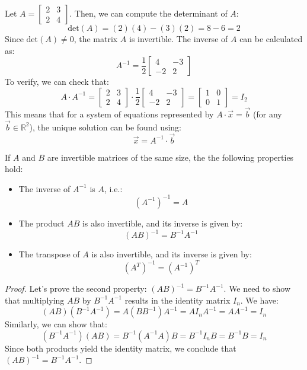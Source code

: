 \begin{eg}
    Let $A = \begin{bmatrix}
        2 & 3 \\
        2 & 4
    \end{bmatrix}$. Then, we can compute the determinant of \( A \):
    \[
        \text{det}(A) = (2)(4) - (3)(2) = 8 - 6 = 2
    \]
    Since \( \text{det}(A) \neq 0 \), the matrix \( A \) is invertible. The inverse of \( A \) can be calculated as:
    \[
        A^{-1} = \frac{1}{2} \begin{bmatrix}
            4 & -3 \\
            -2 & 2
        \end{bmatrix}
    \]
    To verify, we can check that:
    \[
        A \cdot A^{-1} = \begin{bmatrix}
            2 & 3 \\
            2 & 4
        \end{bmatrix} \cdot \frac{1}{2} \begin{bmatrix}
            4 & -3 \\
            -2 & 2
        \end{bmatrix} = \begin{bmatrix}
            1 & 0 \\
            0 & 1
        \end{bmatrix} = I_2
    \]
    This means that for a system of equations represented by \( A \cdot \vec{x} = \vec{b} \) (for any $\vec{b} \in \mathbb{R}^2$), the unique solution can be found using:
    \[
        \vec{x} = A^{-1} \cdot \vec{b}
    \]
\end{eg}
\begin{theorem}
    If $A$ and $B$ are invertible matrices of the same size, the the following properties hold:
    \begin{itemize}[itemsep=1pt,label=$\circ$]
        \item The inverse of $A^{-1}$ is $A$, i.e.:
        \[
            (A^{-1})^{-1} = A
        \]
        \item The product $AB$ is also invertible, and its inverse is given by:
        \[
            (AB)^{-1} = B^{-1} A^{-1}
        \]
        \item The transpose of $A$ is also invertible, and its inverse is given by:
        \[
            (A^T)^{-1} = (A^{-1})^T
        \]
    \end{itemize}
\end{theorem}
\begin{proof}
    Let's prove the second property: \( (AB)^{-1} = B^{-1} A^{-1} \). We need to show that multiplying \( AB \) by \( B^{-1} A^{-1} \) results in the identity matrix \( I_n \). We have:
    \[
        (AB)(B^{-1} A^{-1}) = A(B B^{-1}) A^{-1} = A I_n A^{-1} = A A^{-1} = I_n
    \]
    Similarly, we can show that:
    \[
        (B^{-1} A^{-1})(AB) = B^{-1}(A^{-1} A)B = B^{-1} I_n B = B^{-1} B = I_n
    \]
    Since both products yield the identity matrix, we conclude that \( (AB)^{-1} = B^{-1} A^{-1} \).
\end{proof}

